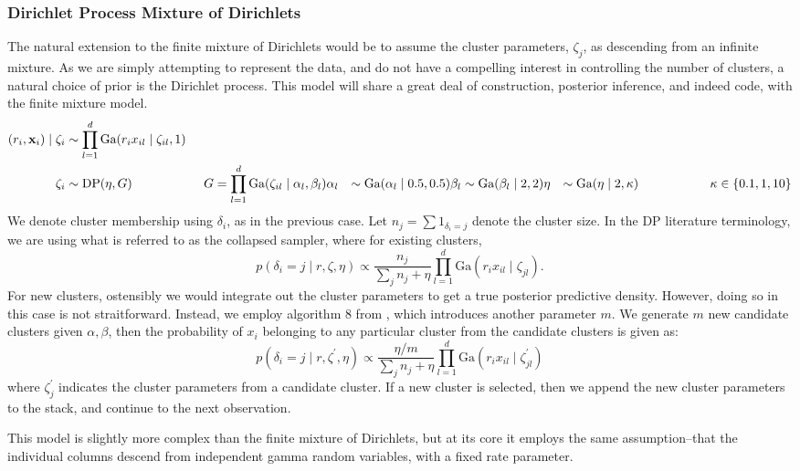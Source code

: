 \subsubsection{Dirichlet Process Mixture of Dirichlets}
The natural extension to the finite mixture of Dirichlets would be to assume the cluster parameters,
  $\zeta_j$, as descending from an infinite mixture.  As we are simply attempting to represent the
  data, and do not have a compelling interest in controlling the number of clusters, a natural
  choice of prior is the Dirichlet process.  This model will share a great deal of construction,
  posterior inference, and indeed code, with the finite mixture model.
  \begin{equation}
    \label{eq:dpsimplex}
    \begin{aligned}
      (r_i, {\bf x}_i) \mid \zeta_i &\sim \prod_{l = 1}^d\text{Ga}(r_ix_{il}\mid \zeta_{il}, 1)\\
      \zeta_i &\sim \text{DP}(\eta, G)\hspace{2cm}G = \prod_{l = 1}^d \text{Ga}(\zeta_{il}\mid \alpha_l,\beta_l)
      \alpha_l &\sim \text{Ga}(\alpha_l \mid 0.5, 0.5)
      \beta_l &\sim \text{Ga}(\beta_l \mid 2, 2)
      \eta &\sim \text{Ga}(\eta \mid 2, \kappa) \hspace{2cm}\kappa \in \lbrace 0.1, 1, 10\rbrace
    \end{aligned}
  \end{equation}
We denote cluster membership using $\delta_i$, as in the previous case.  Let
  $n_j = \sum 1_{\delta_i = j}$ denote the cluster size.  In the DP literature terminology, we
  are using what is referred to as the collapsed sampler, where for existing clusters,
  \begin{equation}
    p(\delta_i = j \mid r, \zeta, \eta) \propto \frac{n_j}{\sum_j n_j + \eta}
                \prod_{l = 1}^d\text{Ga}(r_ix_{il}\mid\zeta_{jl}).
  \end{equation}
For new clusters, ostensibly we would integrate out the cluster parameters to get a true
  posterior predictive density.  However, doing so in this case is not straitforward.  Instead,
  we employ algorithm 8 from \cite{neal2000}, which introduces another parameter $m$.  We
  generate $m$ new candidate clusters given $\alpha,\beta$, then the probability of $x_i$
  belonging to any particular cluster from the candidate clusters is given as:
  \begin{equation}
    p(\delta_i = j \mid r, \zeta^{\prime}, \eta) \propto \frac{\eta / m}{\sum_j n_j + \eta}
                \prod_{l = 1}^d\text{Ga}(r_ix_{il}\mid\zeta_{jl}^{\prime})
  \end{equation}
  where $\zeta_j^{\prime}$ indicates the cluster parameters from a candidate cluster.  If a new
  cluster is selected, then we append the new cluster parameters to the stack, and continue to the
  next observation.

This model is slightly more complex than the finite mixture of Dirichlets, but at its core it
  employs the same assumption--that the individual columns descend from independent gamma random
  variables, with a fixed rate parameter.

